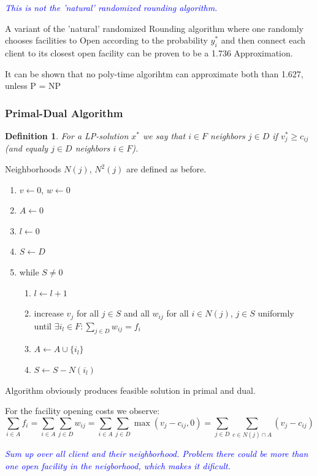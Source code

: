 \documentclass{article}
\newtheorem{definition}{Definition}
\begin{document}
\textcolor{blue}{\emph{This is not the 'natural' randomized rounding algorithm.}}

A variant of the 'natural' randomized Rounding algorithm where one randomly chooses facilities to Open according to the probability $y_i^*$ and then connect each client to its closest open facility can be proven to be a 1.736 Approximation.

It can be shown that no poly-time algorihtm can approximate both than 1.627, unless P = NP

\subsubsection{Primal-Dual Algorithm}

\begin{definition}
For a LP-solution $x^*$ we say that $i \in F$ neighbors $j \in D$ if $v_j^* \geq c_{ij}$ (and equaly $j \in D$ neighbors $i \in F$).
\end{definition}

Neighborhoods $N(j)$, $N^2(j)$ are defined as before.

\begin{enumerate}
\item $v \leftarrow 0$, $w \leftarrow 0$
\item $A \leftarrow 0$
\item $l \leftarrow 0$
\item $S \leftarrow D$
\item while $S \neq 0$
\begin{enumerate}
	\item $l \leftarrow l + 1$
	\item increase $v_j$ for all $j \in S$ and all $w_{ij}$ for all $i\in N(j)$, $j \in S$ uniformly until $\exists i_l \in F: \sum_{j\in D}{w_{ij} = f_i}$
	\item $A \leftarrow A \cup \{i_l\}$
	\item $S \leftarrow S - N(i_l)$
\end{enumerate}
\end{enumerate}

Algorithm obviously produces feasible solution in primal and dual.

For the facility opening costs we observe:
\[
	\sum_{i\in A}{f_i} = \sum_{i\in A}{\sum_{j \in D}{w_{ij}}} = \sum_{i\in A}{\sum_{j \in D}{\max(v_j - c_{ij}, 0)}} = \sum_{j\in D}{\sum_{c \in N(j) \cap A}{(v_j-c_{ij})}}
\]

\textcolor{blue}{\emph{Sum up over all client and their neighborhood. Problem there could be more than one open facility in the neigborhood, which makes it dificult.}}
\end{document}
